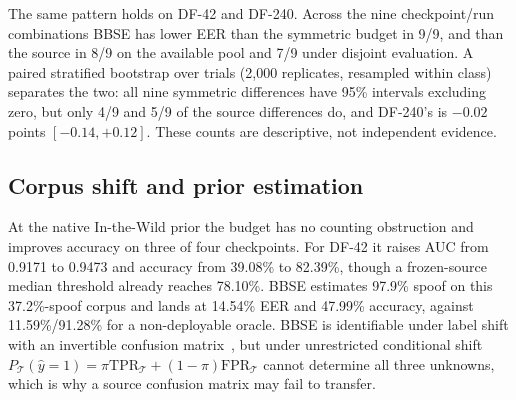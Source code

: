 \documentclass[10pt,letterpaper]{article}
\begin{document}
The same pattern holds on DF-42 and DF-240. Across the nine checkpoint/run
combinations BBSE has lower EER than the symmetric budget in 9/9, and than the
source in 8/9 on the available pool and 7/9 under disjoint evaluation. A paired
stratified bootstrap over trials (2,000 replicates, resampled within class)
separates the two: all nine symmetric differences have 95\% intervals excluding
zero, but only 4/9 and 5/9 of the source differences do, and DF-240's is
$-0.02$ points $[-0.14,+0.12]$. These counts are descriptive, not independent
evidence.

\subsection{Corpus shift and prior estimation}
At the native In-the-Wild prior the budget has no counting obstruction and
improves accuracy on three of four checkpoints. For DF-42 it raises AUC from
0.9171 to 0.9473 and accuracy from 39.08\% to 82.39\%, though a frozen-source
median threshold already reaches 78.10\%. BBSE estimates 97.9\% spoof on this
37.2\%-spoof corpus and lands at 14.54\% EER and 47.99\% accuracy, against
11.59\%/91.28\% for a non-deployable oracle. BBSE is identifiable under label
shift with an invertible confusion matrix~\cite{bbse}, but under unrestricted
conditional shift $P_{\mathcal T}(\hat y=1)=\pi\mathrm{TPR}_{\mathcal T}+
(1-\pi)\mathrm{FPR}_{\mathcal T}$ cannot determine all three unknowns, which is
why a source confusion matrix may fail to transfer.
\end{document}
